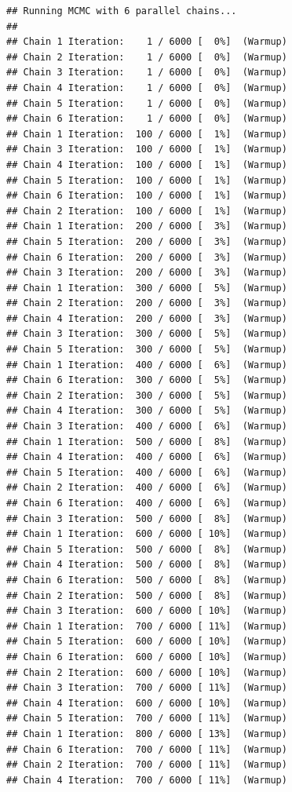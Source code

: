 \documentclass[
]{article}
\begin{document}
\begin{verbatim}
## Running MCMC with 6 parallel chains...
## 
## Chain 1 Iteration:    1 / 6000 [  0%]  (Warmup) 
## Chain 2 Iteration:    1 / 6000 [  0%]  (Warmup) 
## Chain 3 Iteration:    1 / 6000 [  0%]  (Warmup) 
## Chain 4 Iteration:    1 / 6000 [  0%]  (Warmup) 
## Chain 5 Iteration:    1 / 6000 [  0%]  (Warmup) 
## Chain 6 Iteration:    1 / 6000 [  0%]  (Warmup) 
## Chain 1 Iteration:  100 / 6000 [  1%]  (Warmup) 
## Chain 3 Iteration:  100 / 6000 [  1%]  (Warmup) 
## Chain 4 Iteration:  100 / 6000 [  1%]  (Warmup) 
## Chain 5 Iteration:  100 / 6000 [  1%]  (Warmup) 
## Chain 6 Iteration:  100 / 6000 [  1%]  (Warmup) 
## Chain 2 Iteration:  100 / 6000 [  1%]  (Warmup) 
## Chain 1 Iteration:  200 / 6000 [  3%]  (Warmup) 
## Chain 5 Iteration:  200 / 6000 [  3%]  (Warmup) 
## Chain 6 Iteration:  200 / 6000 [  3%]  (Warmup) 
## Chain 3 Iteration:  200 / 6000 [  3%]  (Warmup) 
## Chain 1 Iteration:  300 / 6000 [  5%]  (Warmup) 
## Chain 2 Iteration:  200 / 6000 [  3%]  (Warmup) 
## Chain 4 Iteration:  200 / 6000 [  3%]  (Warmup) 
## Chain 3 Iteration:  300 / 6000 [  5%]  (Warmup) 
## Chain 5 Iteration:  300 / 6000 [  5%]  (Warmup) 
## Chain 1 Iteration:  400 / 6000 [  6%]  (Warmup) 
## Chain 6 Iteration:  300 / 6000 [  5%]  (Warmup) 
## Chain 2 Iteration:  300 / 6000 [  5%]  (Warmup) 
## Chain 4 Iteration:  300 / 6000 [  5%]  (Warmup) 
## Chain 3 Iteration:  400 / 6000 [  6%]  (Warmup) 
## Chain 1 Iteration:  500 / 6000 [  8%]  (Warmup) 
## Chain 4 Iteration:  400 / 6000 [  6%]  (Warmup) 
## Chain 5 Iteration:  400 / 6000 [  6%]  (Warmup) 
## Chain 2 Iteration:  400 / 6000 [  6%]  (Warmup) 
## Chain 6 Iteration:  400 / 6000 [  6%]  (Warmup) 
## Chain 3 Iteration:  500 / 6000 [  8%]  (Warmup) 
## Chain 1 Iteration:  600 / 6000 [ 10%]  (Warmup) 
## Chain 5 Iteration:  500 / 6000 [  8%]  (Warmup) 
## Chain 4 Iteration:  500 / 6000 [  8%]  (Warmup) 
## Chain 6 Iteration:  500 / 6000 [  8%]  (Warmup) 
## Chain 2 Iteration:  500 / 6000 [  8%]  (Warmup) 
## Chain 3 Iteration:  600 / 6000 [ 10%]  (Warmup) 
## Chain 1 Iteration:  700 / 6000 [ 11%]  (Warmup) 
## Chain 5 Iteration:  600 / 6000 [ 10%]  (Warmup) 
## Chain 6 Iteration:  600 / 6000 [ 10%]  (Warmup) 
## Chain 2 Iteration:  600 / 6000 [ 10%]  (Warmup) 
## Chain 3 Iteration:  700 / 6000 [ 11%]  (Warmup) 
## Chain 4 Iteration:  600 / 6000 [ 10%]  (Warmup) 
## Chain 5 Iteration:  700 / 6000 [ 11%]  (Warmup) 
## Chain 1 Iteration:  800 / 6000 [ 13%]  (Warmup) 
## Chain 6 Iteration:  700 / 6000 [ 11%]  (Warmup) 
## Chain 2 Iteration:  700 / 6000 [ 11%]  (Warmup) 
## Chain 4 Iteration:  700 / 6000 [ 11%]  (Warmup) 

\end{verbatim}
\end{document}
